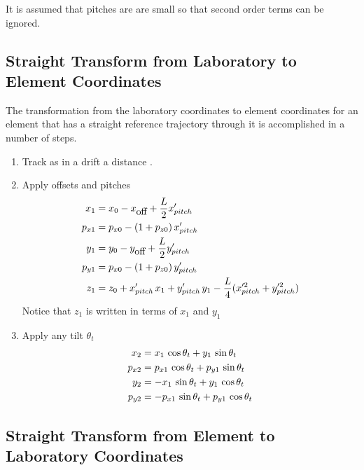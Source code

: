 It is assumed that pitches are are small so that second
order terms can be ignored.

\subsection{Straight Transform from Laboratory to Element Coordinates}

The transformation from the laboratory coordinates to
element coordinates for an element that has a
straight reference trajectory through it is accomplished in a number of steps.
\begin{enumerate}
\item
Track as in a drift a distance .
\item
Apply offsets and pitches
\begin{align}
  x_1    &= x_0 - x_{\mbox{off}} + \frac{L}{2} x'_{pitch} \nonumber \\
  p_{x1} &= p_{x0} - (1 + p_{z0}) \, x'_{pitch} \nonumber \\
  y_1    &= y_0 - y_{\mbox{off}} + \frac{L}{2} y'_{pitch} \\
  p_{y1} &= p_{x0} - (1 + p_{z0}) \, y'_{pitch} \nonumber \\
  z_1    &= z_0 + x'_{pitch} \, x_1 + y'_{pitch} \, y_1 - 
    \frac{L}{4} (x^{\prime2}_{pitch} + y^{\prime2}_{pitch}) \nonumber
\end{align}
Notice that $z_1$ is written in terms of $x_1$ and $y_1$
\item
Apply any tilt $\theta_t$
\begin{align}
  x_2    &=  x_1    \, \cos\theta_t + y_1    \, \sin\theta_t \nonumber \\
  p_{x2} &=  p_{x1} \, \cos\theta_t + p_{y1} \, \sin\theta_t \nonumber \\
  y_2    &= -x_1    \, \sin\theta_t + y_1    \, \cos\theta_t \\
  p_{y2} &= -p_{x1} \, \sin\theta_t + p_{y1} \, \cos\theta_t \nonumber
\end{align}
\end{enumerate}

\subsection{Straight Transform from Element to Laboratory Coordinates}

